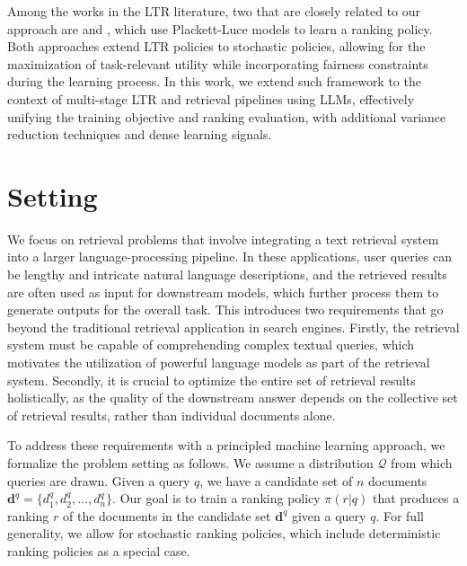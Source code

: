 \documentclass{article}
\begin{document}
Among the works in the LTR literature, two that are closely related to our \alg{} approach are \cite{singh2019policy} and \cite{oosterhuis2021computationally}, which use Plackett-Luce models to learn a ranking policy. Both approaches extend LTR policies to stochastic policies, allowing for the maximization of task-relevant utility while incorporating fairness constraints during the learning process. In this work, we extend such framework to the context of multi-stage LTR and retrieval pipelines using LLMs, effectively unifying the training objective and ranking evaluation, with additional variance reduction techniques and dense learning signals.











\section{Setting}
\label{sec:setting}


We focus on retrieval problems that involve integrating a text retrieval system into a larger language-processing pipeline. In these applications, user queries can be lengthy and intricate natural language descriptions, and the retrieved results are often used as input for downstream models, which further process them to generate outputs for the overall task. This introduces two requirements that go beyond the traditional retrieval application in search engines. Firstly, the retrieval system must be capable of comprehending complex textual queries, which motivates the utilization of powerful language models as part of the retrieval system. Secondly, it is crucial to optimize the entire set of retrieval results holistically, as the quality of the downstream answer depends on the collective set of retrieval results, rather than individual documents alone.


To address these requirements with a principled machine learning approach, we formalize the problem setting as follows. We assume a distribution $\mathcal{Q}$ from which queries are drawn.  Given a query $q$, we have a candidate set of $n$ documents $\mathbf{d}^{q} = \{d_1^{q}, d_2^{q}, \ldots, d_n^{q}\}$. 
Our goal is to train a ranking policy $\pi(r|q)$ that produces a ranking $r$ of the documents in the candidate set $\mathbf{d}^{q}$ given a query $q$. For full generality, we allow for stochastic ranking policies, which include deterministic ranking policies as a special case.
\end{document}
